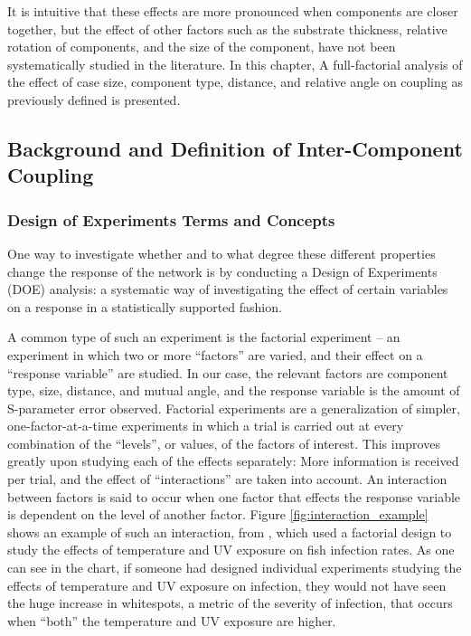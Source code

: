 \documentclass[12pt]{usfcoe}
\begin{document}
        It is intuitive that these effects are more pronounced when
    components are closer together, but the effect of other factors such as the substrate thickness, relative rotation of components, and the size of the component, have not been systematically studied in the literature. 
    In this chapter, A full-factorial analysis of the effect of case size, component type, distance, and relative angle on coupling as previously defined is presented. 
    \subsection{Background and Definition of Inter-Component Coupling}
    
    \subsubsection{Design of Experiments Terms and Concepts}
    One way to investigate whether and to what degree these different properties change the response of the network is by conducting a Design of Experiments (DOE) analysis: a systematic way of investigating the effect of certain variables on a response in a statistically supported fashion. 
    
    A common type of such an experiment is the factorial experiment -- an experiment in which two or more ``factors'' are varied, and their effect on a ``response variable'' are studied.
    In our case, the relevant factors are component type, size, distance, and mutual angle, and the response variable is the amount of S-parameter error observed.
    Factorial experiments are a generalization of simpler, one-factor-at-a-time experiments in which a trial is carried out at every combination of the ``levels'', or values, of the factors of interest. 
    This improves greatly upon studying each of the effects separately: More information is received per trial, and the effect of ``interactions'' are taken into account. 
    An interaction between factors is said to occur when  one factor that effects the response variable is dependent on the level of another factor. 
    Figure \ref{fig:interaction_example} shows an example of such an interaction, from \cite{interaction_example}, which used a factorial design to study the effects of temperature and UV exposure on fish infection rates. 
    As one can see in the chart, if someone had designed individual experiments studying the effects of temperature and UV exposure on infection, they would not have seen the huge increase in whitespots, a metric of the severity of infection, that occurs when ``both'' the temperature and UV exposure are higher.  
    
\end{document}
